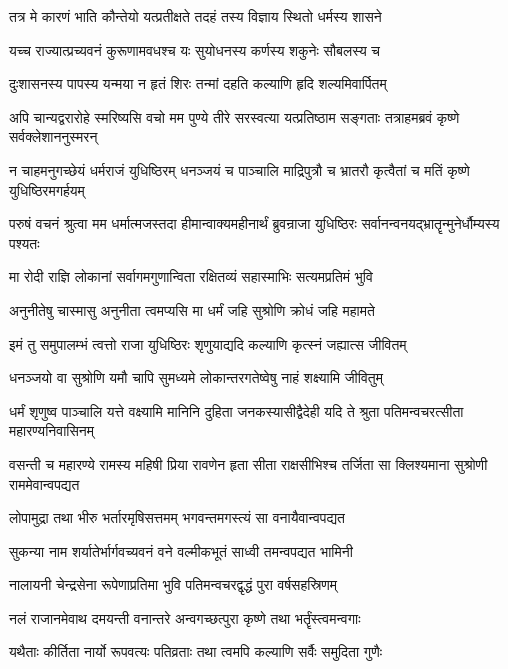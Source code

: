 \twolineshloka
{तत्र मे कारणं भाति कौन्तेयो यत्प्रतीक्षते}
{तदहं तस्य विज्ञाय स्थितो धर्मस्य शासने}


\twolineshloka
{यच्च राज्यात्प्रच्यवनं कुरूणामवधश्च यः}
{सुयोधनस्य कर्णस्य शकुनेः सौबलस्य च}


\twolineshloka
{दुःशासनस्य पापस्य यन्मया न हृतं शिरः}
{तन्मां दहति कल्याणि हृदि शल्यमिवार्पितम्}


\threelineshloka
{अपि चान्यद्वरारोहे स्मरिष्यसि वचो मम}
{पुण्ये तीरे सरस्वत्या यत्प्रतिष्ठाम सङ्गताः}
{तत्राहमब्रवं कृष्णे सर्वक्लेशाननुस्मरन्}


\threelineshloka
{न चाहमनुगच्छेयं धर्मराजं युधिष्ठिरम्}
{धनञ्जयं च पाञ्चालि माद्रिपुत्रौ च भ्रातरौ}
{कृत्वैतां च मतिं कृष्णे युधिष्ठिरमगर्हयम्}


\threelineshloka
{परुषं वचनं श्रुत्वा मम धर्मात्मजस्तदा}
{हीमान्वाक्यमहीनार्थं ब्रुवन्राजा युधिष्ठिरः}
{सर्वानन्वनयद्भ्रातॄन्मुनेर्धौम्यस्य पश्यतः}


\twolineshloka
{मा रोदी राज्ञि लोकानां सर्वागमगुणान्विता}
{रक्षितव्यं सहास्माभिः सत्यमप्रतिमं भुवि}


\twolineshloka
{अनुनीतेषु चास्मासु अनुनीता त्वमप्यसि}
{मा धर्मं जहि सुश्रोणि क्रोधं जहि महामते}


\twolineshloka
{इमं तु समुपालम्भं त्वत्तो राजा युधिष्ठिरः}
{शृणुयाद्यदि कल्याणि कृत्स्नं जह्यात्स जीवितम्}


\twolineshloka
{धनञ्जयो वा सुश्रोणि यमौ चापि सुमध्यमे}
{लोकान्तरगतेष्वेषु नाहं शक्ष्यामि जीवितुम्}


\onelineshloka
{धर्मं शृणुष्व पाञ्चालि यत्ते वक्ष्यामि मानिनि}
\twolineshloka
{दुहिता जनकस्यासीद्वैदेही यदि ते श्रुता}
{पतिमन्वचरत्सीता महारण्यनिवासिनम्}


\threelineshloka
{वसन्ती च महारण्ये रामस्य महिषी प्रिया}
{रावणेन हृता सीता राक्षसीभिश्च तर्जिता}
{सा क्लिश्यमाना सुश्रोणी राममेवान्वपद्यत}


\twolineshloka
{लोपामुद्रा तथा भीरु भर्तारमृषिसत्तमम्}
{भगवन्तमगस्त्यं सा वनायैवान्वपद्यत}


\twolineshloka
{सुकन्या नाम शर्यातेर्भार्गवच्यवनं वने}
{वल्मीकभूतं साध्वी तमन्वपद्यत भामिनी}


\twolineshloka
{नालायनी चेन्द्रसेना रूपेणाप्रतिमा भुवि}
{पतिमन्वचरद्वृद्धं पुरा वर्षसहस्रिणम्}


\twolineshloka
{नलं राजानमेवाथ दमयन्ती वनान्तरे}
{अन्वगच्छत्पुरा कृष्णे तथा भर्तॄंस्त्वमन्वगाः}


\twolineshloka
{यथैताः कीर्तिता नार्यो रूपवत्यः पतिव्रताः}
{तथा त्वमपि कल्याणि सर्वैः समुदिता गुणैः}


